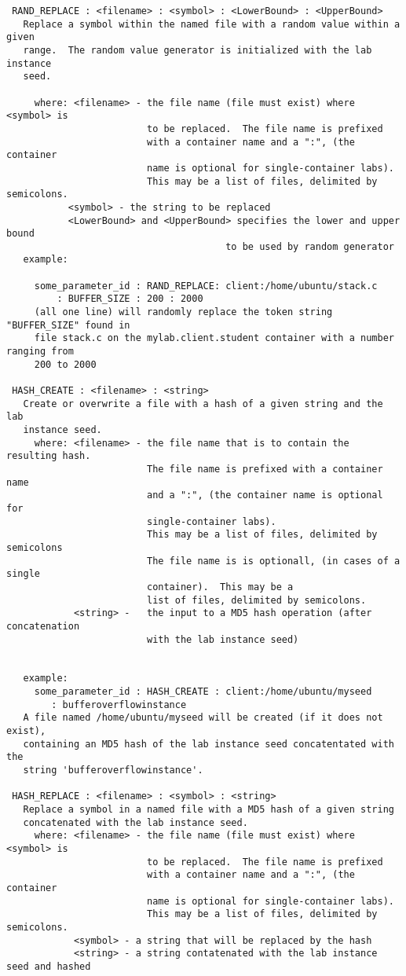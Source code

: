 \documentclass[12pt]{article}
\begin{document}
\begin{verbatim}
 RAND_REPLACE : <filename> : <symbol> : <LowerBound> : <UpperBound>
   Replace a symbol within the named file with a random value within a given
   range.  The random value generator is initialized with the lab instance
   seed.

     where: <filename> - the file name (file must exist) where <symbol> is 
                         to be replaced.  The file name is prefixed 
                         with a container name and a ":", (the container 
                         name is optional for single-container labs).  
                         This may be a list of files, delimited by semicolons. 
           <symbol> - the string to be replaced
           <LowerBound> and <UpperBound> specifies the lower and upper bound
                                       to be used by random generator
   example:

     some_parameter_id : RAND_REPLACE: client:/home/ubuntu/stack.c 
         : BUFFER_SIZE : 200 : 2000
     (all one line) will randomly replace the token string "BUFFER_SIZE" found in
     file stack.c on the mylab.client.student container with a number ranging from 
     200 to 2000
 
 HASH_CREATE : <filename> : <string>
   Create or overwrite a file with a hash of a given string and the lab 
   instance seed.
     where: <filename> - the file name that is to contain the resulting hash.
                         The file name is prefixed with a container name 
                         and a ":", (the container name is optional for 
                         single-container labs).  
                         This may be a list of files, delimited by semicolons 
                         The file name is is optionall, (in cases of a single
                         container).  This may be a 
                         list of files, delimited by semicolons.
            <string> -   the input to a MD5 hash operation (after concatenation 
                         with the lab instance seed)
                       
                   
   example:
     some_parameter_id : HASH_CREATE : client:/home/ubuntu/myseed 
        : bufferoverflowinstance
   A file named /home/ubuntu/myseed will be created (if it does not exist), 
   containing an MD5 hash of the lab instance seed concatentated with the 
   string 'bufferoverflowinstance'.
 
 HASH_REPLACE : <filename> : <symbol> : <string>
   Replace a symbol in a named file with a MD5 hash of a given string 
   concatenated with the lab instance seed.
     where: <filename> - the file name (file must exist) where <symbol> is 
                         to be replaced.  The file name is prefixed 
                         with a container name and a ":", (the container 
                         name is optional for single-container labs).  
                         This may be a list of files, delimited by semicolons. 
            <symbol> - a string that will be replaced by the hash
            <string> - a string contatenated with the lab instance seed and hashed


\end{verbatim}
\end{document}
